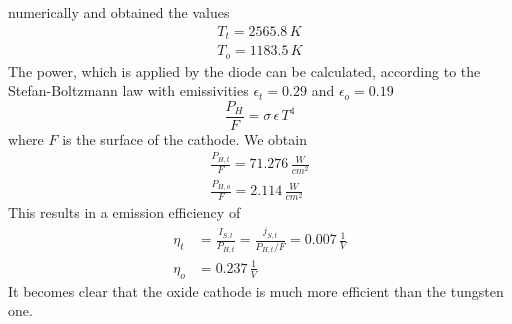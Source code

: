 \documentclass[a4paper, 12pt]{scrartcl}
\begin{document}
numerically and obtained the values
\begin{gather*}T_t=2565.8\,K\\T_o=1183.5\,K\end{gather*}
The power, which is applied by the diode can be calculated, according to the Stefan-Boltzmann law with emissivities $\epsilon_t=0.29$ and $\epsilon_o=0.19$
\begin{equation*}\frac{P_H}{F}=\sigma\,\epsilon\,T^4\end{equation*}
where $F$ is the surface of the cathode. We obtain
\begin{gather*}\frac{P_{H,t}}{F}=71.276\,\frac{W}{cm^2}\\\frac{P_{H,o}}{F}=2.114\,\frac{W}{cm^2}\end{gather*}
This results in a emission efficiency of
\begin{align*}\eta_t&=\frac{I_{S,t}}{P_{H,t}}=\frac{j_{S,t}}{P_{H,t}/F}=0.007\,\frac{1}{V}\\
\eta_o&=0.237\,\frac{1}{V}\end{align*}
It becomes clear that the oxide cathode is much more efficient than the tungsten one.
\newpage
\end{document}

